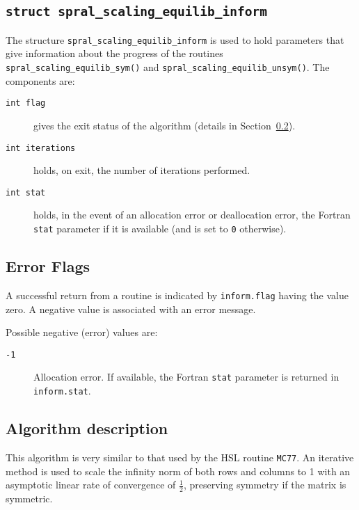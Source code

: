 \subsection{\texttt{struct spral\_scaling\_equilib\_inform}} \label{type:equilib_inform}

The structure \texttt{spral\_scaling\_equilib\_inform} is used to hold parameters that
give information about the progress of the routines
\texttt{spral\_scaling\_equilib\_sym()} and \texttt{spral\_scaling\_equilib\_unsym()}. The components are:

\begin{description}

\item[\texttt{int flag}] gives the exit status of the algorithm (details in Section~\ref{returns:equilib}).

\item[\texttt{int iterations}]  holds, on exit,
   the number of iterations performed.

\item[\texttt{int stat}] holds, in the event of an allocation error or deallocation error, the Fortran \texttt{stat} parameter if it is available (and is set to \texttt{0} otherwise).

\end{description}

\subsection{Error Flags} \label{returns:equilib}
A successful return from a routine is indicated by \texttt{inform.flag} having the value zero. A negative value is associated with an error message.

Possible negative (error) values are:
\begin{description}
\item[\texttt{-1}] Allocation error. If available, the Fortran \texttt{stat} parameter is returned in \texttt{inform.stat}.
\end{description}

\subsection{Algorithm description}

This algorithm is very similar to that used by the HSL routine \texttt{MC77}.
An iterative method
is used to scale the infinity norm of both rows and columns to 1 with an asymptotic linear rate of convergence of $\frac{1}{2}$, preserving symmetry if the matrix is symmetric.

